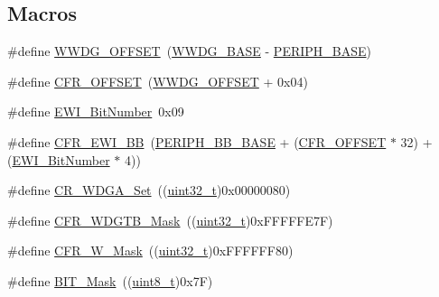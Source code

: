 \subsection*{Macros}
\begin{DoxyCompactItemize}
\item 
\#define \hyperlink{group___w_w_d_g___private___defines_gab6dcdf2385dd7317ec775e146cff40ca}{W\+W\+D\+G\+\_\+\+O\+F\+F\+S\+ET}~(\hyperlink{openmotestm_2library_2inc_2stm32f10x__map_8h_a9a5bf4728ab93dea5b569f5b972cbe62}{W\+W\+D\+G\+\_\+\+B\+A\+SE} -\/ \hyperlink{openmotestm_2library_2inc_2stm32f10x__map_8h_a9171f49478fa86d932f89e78e73b88b0}{P\+E\+R\+I\+P\+H\+\_\+\+B\+A\+SE})
\item 
\#define \hyperlink{group___w_w_d_g___private___defines_ga3e0f9d9f7f69a6d133bba721e25aca4a}{C\+F\+R\+\_\+\+O\+F\+F\+S\+ET}~(\hyperlink{openmotestm_2library_2src_2stm32f10x__wwdg_8c_ab6dcdf2385dd7317ec775e146cff40ca}{W\+W\+D\+G\+\_\+\+O\+F\+F\+S\+ET} + 0x04)
\item 
\#define \hyperlink{group___w_w_d_g___private___defines_ga97c9005823520f5aaefe211923b48215}{E\+W\+I\+\_\+\+Bit\+Number}~0x09
\item 
\#define \hyperlink{group___w_w_d_g___private___defines_gaa48804210cea547f0e0f4ca49c44fc94}{C\+F\+R\+\_\+\+E\+W\+I\+\_\+\+BB}~(\hyperlink{openmotestm_2library_2inc_2stm32f10x__map_8h_aed7efc100877000845c236ccdc9e144a}{P\+E\+R\+I\+P\+H\+\_\+\+B\+B\+\_\+\+B\+A\+SE} + (\hyperlink{openmotestm_2library_2src_2stm32f10x__wwdg_8c_a3e0f9d9f7f69a6d133bba721e25aca4a}{C\+F\+R\+\_\+\+O\+F\+F\+S\+ET} $\ast$ 32) + (\hyperlink{openmotestm_2library_2src_2stm32f10x__wwdg_8c_a97c9005823520f5aaefe211923b48215}{E\+W\+I\+\_\+\+Bit\+Number} $\ast$ 4))
\item 
\#define \hyperlink{group___w_w_d_g___private___defines_ga4c66a66daa0e09782e8b2248db9b35f6}{C\+R\+\_\+\+W\+D\+G\+A\+\_\+\+Set}~((\hyperlink{_p_e___types_8h_a33594304e786b158f3fb30289278f5af}{uint32\+\_\+t})0x00000080)
\item 
\#define \hyperlink{group___w_w_d_g___private___defines_ga2b74f53d33f15b272b2d1ef78a78a2cc}{C\+F\+R\+\_\+\+W\+D\+G\+T\+B\+\_\+\+Mask}~((\hyperlink{_p_e___types_8h_a33594304e786b158f3fb30289278f5af}{uint32\+\_\+t})0x\+F\+F\+F\+F\+F\+E7\+F)
\item 
\#define \hyperlink{group___w_w_d_g___private___defines_gac00816db9fe6715f702b4f7d6085ce30}{C\+F\+R\+\_\+\+W\+\_\+\+Mask}~((\hyperlink{_p_e___types_8h_a33594304e786b158f3fb30289278f5af}{uint32\+\_\+t})0x\+F\+F\+F\+F\+F\+F80)
\item 
\#define \hyperlink{group___w_w_d_g___private___defines_ga01a4e07e98e933af78671f65a49bd836}{B\+I\+T\+\_\+\+Mask}~((\hyperlink{_p_e___types_8h_aba7bc1797add20fe3efdf37ced1182c5}{uint8\+\_\+t})0x7\+F)
\end{DoxyCompactItemize}
